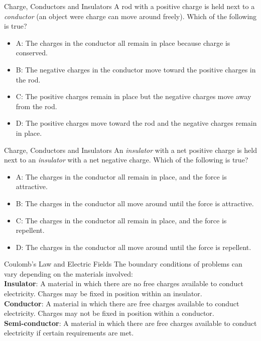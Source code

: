 \documentclass{beamer}
\begin{document}
\begin{frame}{Charge, Conductors and Insulators}
A rod with a positive charge is held next to a \textit{conductor} (an object were charge can move around freely).  Which of the following is true?
\begin{itemize}
\item A: The charges in the conductor all remain in place because charge is conserved.
\item B: The negative charges in the conductor move toward the positive charges in the rod.
\item C: The positive charges remain in place but the negative charges move away from the rod.
\item D: The positive charges move toward the rod and the negative charges remain in place.
\end{itemize}
\end{frame}

\begin{frame}{Charge, Conductors and Insulators}
An \textit{insulator} with a net positive charge is held next to an \textit{insulator} with a net negative charge.  Which of the following is true?
\begin{itemize}
\item A: The charges in the conductor all remain in place, and the force is attractive.
\item B: The charges in the conductor all move around until the force is attractive.
\item C: The charges in the conductor all remain in place, and the force is repellent.
\item D: The charges in the conductor all move around until the force is repellent.
\end{itemize}
\end{frame}

\begin{frame}{Coulomb’s Law and Electric Fields}
The boundary conditions of problems can vary depending on the materials involved: \\ \vspace{0.5cm}
\textbf{Insulator}: A material in which there are no free charges available to conduct electricity.  Charges may be fixed in position within an insulator. \\
\textbf{Conductor}: A material in which there are free charges available to conduct electricity.  Charges may not be fixed in position within a conductor. \\
\textbf{Semi-conductor}: A material in which there are free charges available to conduct electricity if certain requirements are met.
\end{frame}
\end{document}
